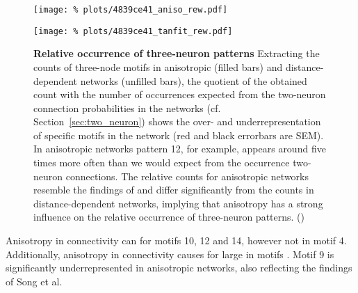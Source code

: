 \begin{figure}[H]
  \centering
  \texttt{[image: \%
    plots/4839ce41\_aniso\_rew.pdf]}

  \texttt{[image: \%
    plots/4839ce41\_tanfit\_rew.pdf]}

  \vspace{0.4cm}


  \captionsetup{skip=8pt}
  \caption{\textbf{Relative occurrence of three-neuron patterns}
    Extracting the counts of three-node motifs in anisotropic (filled
    bars) and distance-dependent networks (unfilled bars), the
    quotient of the obtained count with the number of occurrences
    expected from the two-neuron connection probabilities in the
    networks (cf. Section~\ref{sec:two_neuron}) shows the over- and
    underrepresentation of specific motifs in the network (red and
    black errorbars are SEM). In anisotropic networks pattern 12, for
    example, appears around five times more often than we would expect
    from the occurrence two-neuron connections. The relative counts
    for anisotropic networks resemble the findings of
    \textcite{Song2005} and differ significantly from the counts in
    distance-dependent networks, implying that anisotropy has a strong
    influence on the relative occurrence of three-neuron
    patterns. () }
  \label{fig:distance_3motif_compare}
\end{figure}



Anisotropy in connectivity can for motifs 10, 12 and 14, however not
in motif 4. Additionally, anisotropy in connectivity causes for large
in motifs . Motif 9 is significantly underrepresented in anisotropic
networks, also reflecting the findings of Song et al.



